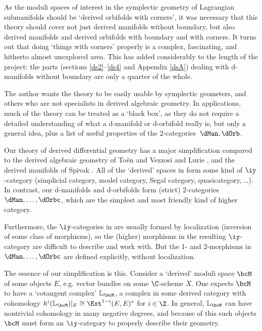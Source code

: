 \documentclass{article}
\begin{document}
As the moduli spaces of interest in the symplectic geometry of
Lagrangian submanifolds should be `derived
orbifolds with corners', it was necessary that this theory should
cover not just derived manifolds without boundary, but also derived
manifolds and derived orbifolds with boundary and with corners. It
turns out that doing `things with corners' properly is a complex,
fascinating, and hitherto almost unexplored area. This has added
considerably to the length of the project: the parts (sections
\ref{ds2}--\ref{ds4} and Appendix \ref{dsA}) dealing with
d-manifolds without boundary are only a quarter of the whole.

The author wants the theory to be easily usable by symplectic
geometers, and others who are not specialists in derived algebraic
geometry. In applications, much of the theory can be treated as a
`black box', as they do not require a detailed understanding of what
a d-manifold or d-orbifold really is, but only a general idea, plus
a list of useful properties of the
2-categories~$\dMan,\dOrb$.

Our theory of derived differential geometry has a major
simplification compared to the derived algebraic geometry of To\"en and Vezzosi \cite{Toen,ToVe1,ToVe2}
and Lurie \cite{Luri1,Luri2,Luri3}, and the derived manifolds of
Spivak \cite{Spiv}. All of the
`derived' spaces in \cite{Luri1,Luri2,Luri3,Toen,ToVe1,ToVe2,Spiv}
form some kind of $\iy$-category (simplicial
category, model category, Segal category, quasicategory, \ldots). In
contrast, our d-manifolds and d-orbifolds form (strict) 2-categories
$\dMan,\ldots,\dOrbc$, which are the simplest and most friendly kind
of higher category.

Furthermore, the $\iy$-categories in \cite{Luri1,Luri2,Luri3,Toen,
ToVe1,ToVe2,Spiv} are usually formed by localization (inversion of
some class of morphisms), so the (higher) morphisms in the resulting
$\iy$-category are difficult to describe and work with. But the 1-
and 2-morphisms in $\dMan,\ldots,\dOrbc$ are defined explicitly,
without localization.

The essence of our simplification is this. Consider a `derived'
moduli space $\bcM$ of some objects $E$, e.g. vector bundles on some
$\C$-scheme $X$. One expects $\bcM$ to have a `cotangent
complex' ${\mathbb L}_\bcM$, a complex in some
derived category with cohomology $h^i({\mathbb
L}_\bcM)\vert_E\cong\Ext^{1-i}(E,E)^*$ for $i\in\Z$. In general,
${\mathbb L}_\bcM$ can have nontrivial cohomology in many negative
degrees, and because of this such objects $\bcM$ must form an
$\iy$-category to properly describe their geometry.
\end{document}
